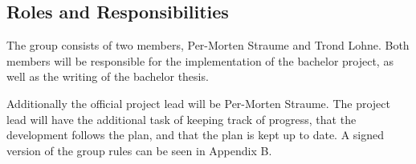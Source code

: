 \subsection{Roles and Responsibilities}
The group consists of two members, Per-Morten Straume and Trond Lohne.
Both members will be responsible for the implementation of the bachelor project, as well as the writing of the bachelor thesis.

\noindent Additionally the official project lead will be Per-Morten Straume.
The project lead will have the additional task of keeping track of progress,
that the development follows the plan, and that the plan is kept up to date.
A signed version of the group rules can be seen in Appendix B.
